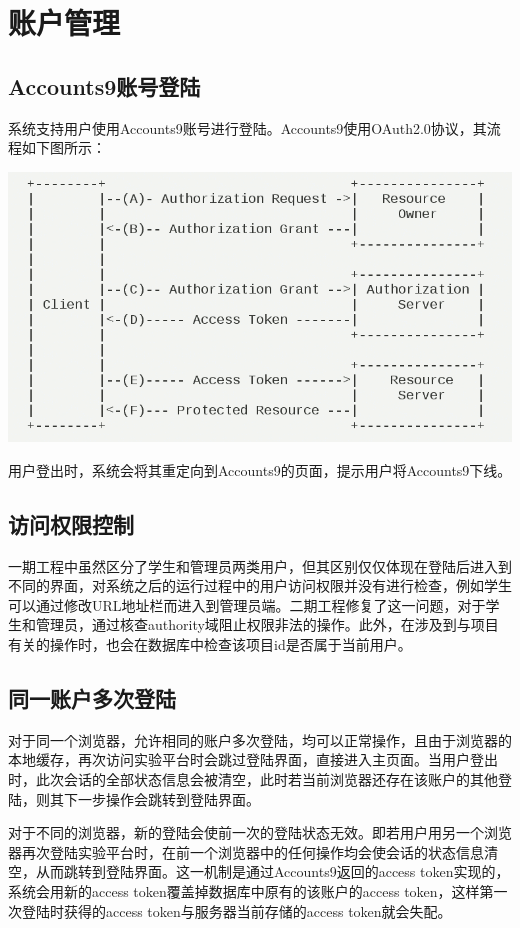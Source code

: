 \section{账户管理}
\subsection{Accounts9账号登陆}
系统支持用户使用Accounts9账号进行登陆。Accounts9使用OAuth2.0协议，其流程如下图所示：
\begin{center}
    \includegraphics[width=14cm]{image/account/oauth.png}
\end{center}
用户登出时，系统会将其重定向到Accounts9的页面，提示用户将Accounts9下线。

\subsection{访问权限控制}
一期工程中虽然区分了学生和管理员两类用户，但其区别仅仅体现在登陆后进入到不同的界面，对系统之后的运行过程中的用户访问权限并没有进行检查，例如学生可以通过修改URL地址栏而进入到管理员端。二期工程修复了这一问题，对于学生和管理员，通过核查authority域阻止权限非法的操作。此外，在涉及到与项目有关的操作时，也会在数据库中检查该项目id是否属于当前用户。

\subsection{同一账户多次登陆}
对于同一个浏览器，允许相同的账户多次登陆，均可以正常操作，且由于浏览器的本地缓存，再次访问实验平台时会跳过登陆界面，直接进入主页面。当用户登出时，此次会话的全部状态信息会被清空，此时若当前浏览器还存在该账户的其他登陆，则其下一步操作会跳转到登陆界面。

对于不同的浏览器，新的登陆会使前一次的登陆状态无效。即若用户用另一个浏览器再次登陆实验平台时，在前一个浏览器中的任何操作均会使会话的状态信息清空，从而跳转到登陆界面。这一机制是通过Accounts9返回的access token实现的，系统会用新的access token覆盖掉数据库中原有的该账户的access token，这样第一次登陆时获得的access token与服务器当前存储的access token就会失配。